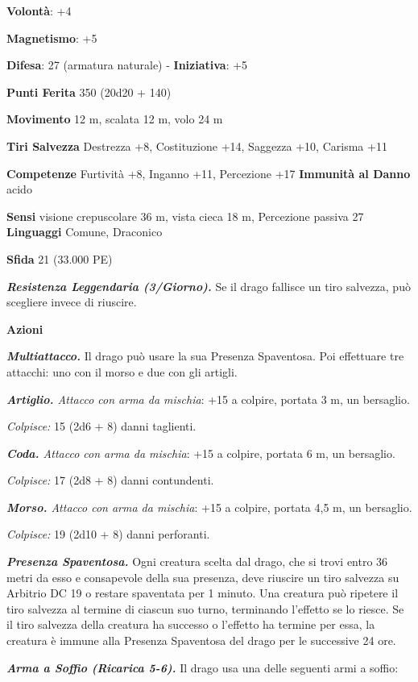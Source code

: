 \begin{multicols}{2}
\textbf{Volontà}: +4

\textbf{Magnetismo}: +5

\textbf{Difesa}: 27 (armatura naturale) - \textbf{Iniziativa}: +5

\textbf{Punti Ferita} 350 (20d20 + 140)

\textbf{Movimento} 12 m, scalata 12 m, volo 24 m

\textbf{Tiri Salvezza} Destrezza +8, Costituzione +14, Saggezza +10,
Carisma +11

\textbf{Competenze} Furtività +8, Inganno +11, Percezione +17
\textbf{Immunità al Danno} acido

\textbf{Sensi} visione crepuscolare 36 m, vista cieca 18 m, Percezione passiva
27 \textbf{Linguaggi} Comune, Draconico

\textbf{Sfida} 21 (33.000 PE)\smallskip

\emph{\textbf{Resistenza Leggendaria (3/Giorno).}} Se il drago fallisce
un tiro salvezza, può scegliere invece di riuscire.

\smallskip\textbf{Azioni}

\emph{\textbf{Multiattacco.}} Il drago può usare la sua Presenza
Spaventosa. Poi effettuare tre attacchi: uno con il morso e due con gli
artigli.

\emph{\textbf{Artiglio.} Attacco con arma da mischia}: +15 a colpire,
portata 3 m, un bersaglio.

\emph{Colpisce:} 15 (2d6 + 8) danni taglienti.

\emph{\textbf{Coda.} Attacco con arma da mischia}: +15 a colpire,
portata 6 m, un bersaglio.

\emph{Colpisce:} 17 (2d8 + 8) danni contundenti.

\emph{\textbf{Morso.} Attacco con arma da mischia}: +15 a colpire,
portata 4,5 m, un bersaglio.

\emph{Colpisce:} 19 (2d10 + 8) danni perforanti.

\emph{\textbf{Presenza Spaventosa.}} Ogni creatura scelta dal drago, che
si trovi entro 36 metri da esso e consapevole della sua presenza, deve
riuscire un tiro salvezza su Arbitrio DC 19 o restare spaventata per 1
minuto. Una creatura può ripetere il tiro salvezza al termine di ciascun
suo turno, terminando l'effetto se lo riesce. Se il tiro salvezza della
creatura ha successo o l'effetto ha termine per essa, la creatura è
immune alla Presenza Spaventosa del drago per le successive 24 ore.

\emph{\textbf{Arma a Soffio (Ricarica 5-6).}} Il drago usa una delle
seguenti armi a soffio:


\end{multicols}
